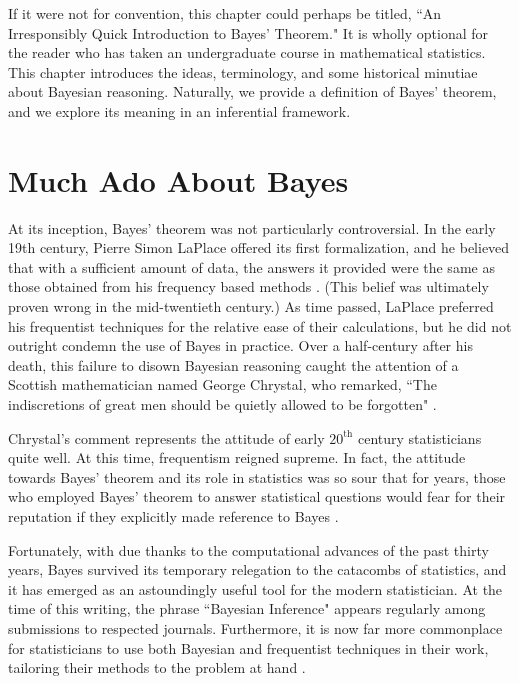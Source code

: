 \documentclass[12pt,twoside]{reedthesis}
\begin{document}
	If it were not for convention, this chapter could perhaps be titled, ``An Irresponsibly Quick Introduction to Bayes' Theorem." It is wholly optional for the reader who has taken an undergraduate course in mathematical statistics. This chapter introduces the ideas, terminology, and some historical minutiae about Bayesian reasoning. Naturally, we provide a definition of Bayes' theorem, and we explore its meaning in an inferential framework. 
	\section{Much Ado About Bayes}
	At its inception, Bayes' theorem was not particularly controversial. In the early 19th century, Pierre Simon LaPlace offered its first formalization, and he believed that with a sufficient amount of data, the answers it provided were the same as those obtained from his frequency based methods \cite{hist}. (This belief was ultimately proven wrong in the mid-twentieth century.)
	As time passed, LaPlace preferred his frequentist techniques for the relative ease of their calculations, but he did not outright condemn the use of Bayes in practice. Over a half-century after his death, this failure to disown Bayesian reasoning caught the attention of a Scottish mathematician named George Chrystal, who remarked, ``The indiscretions of great men should be quietly allowed to be forgotten" \cite{hist}.
	
	Chrystal's comment represents the attitude of early $20^{\text{th}}$ century statisticians quite well. At this time, frequentism reigned supreme. In fact, the attitude towards Bayes' theorem and its role in statistics was so sour that for years, those who employed Bayes' theorem to answer statistical questions would fear for their reputation if they explicitly made reference to Bayes \cite{hist}. 
	
	Fortunately, with due thanks to the computational advances of the past thirty years, Bayes survived its temporary relegation to the catacombs of statistics, and it has emerged as an astoundingly useful tool for the modern statistician. At the time of this writing, the phrase ``Bayesian Inference" appears regularly among submissions to respected journals. Furthermore, it is now far more commonplace for statisticians to use both Bayesian and frequentist techniques in their work, tailoring their methods to the problem at hand \cite{liu}.
	
\end{document}
